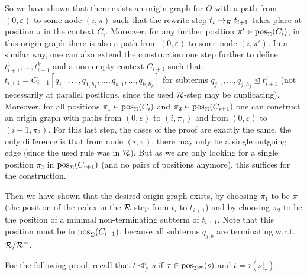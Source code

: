 \begin{myproof}
So we have shown that 
    there exists an origin graph for $\Theta$ with a path from
    $(0,\varepsilon)$ to some node $(i,\pi)$
    such that
    the rewrite step $t_i \to_{\mathcal{R}} t_{i+1}$ takes place at position $\pi$ in the context
    $C_i$. Moreover, for any further position $\pi' \in \mathrm{pos}_\Sigma(C_i)$, in this origin
    graph there is also a path from   $(0,\varepsilon)$ to some node $(i,\pi')$.
In a similar way, one can also extend the construction one step further to define 
$t_{i+1}^1,\ldots,t_{i+1}^k$ and a non-empty context $C_{i+1}$ such that
 $t_{i+1} = C_{i+1}[q_{1,1},\ldots,q_{1,h_1}, \ldots, q_{k,1}, \ldots, q_{k, h_k}]$ for
subterms $q_{j,1},\ldots,q_{j,h_j} \trianglelefteq t_{i+1}^j$ (not necessarily at parallel positions, 
since the used $\mathcal{R}$-step may be duplicating).
%
Moreover,  for all  positions $\pi_1 \in \mathrm{pos}_\Sigma(C_i)$ and  $\pi_2 \in \mathrm{pos}_\Sigma(C_{i+1})$
   one
    can construct an origin graph with paths from $(0,\varepsilon)$ to $(i, \pi_1)$ and
from $(0,\varepsilon)$ to
    $(i+1, \pi_2)$.
For this last step,
 the cases of the proof are exactly the same, the only difference is that from node $(i,\pi)$,
    there may only be a single outgoing edge (since the used rule was in $\mathcal{R}$).
    But as we are only looking for a single position $\pi_2$ in $\mathrm{pos}_\Sigma(C_{i+1})$
    (and no pairs of positions anymore), 
    this suffices for the construction.

Then we have shown that the desired origin graph exists, by choosing $\pi_1$ to be $\pi$
(the position of the redex in the $\mathcal{R}$-step from $t_i$ to $t_{i+1}$)
and by choosing $\pi_2$ to be the position of a minimal non-terminating subterm of
$t_{i+1}$. Note that this position must be in $\mathrm{pos}_\Sigma(C_{i+1})$, because all subterms
$q_{j,b}$ are terminating w.r.t.\ $\mathcal{R}/\mathcal{R}^=$.    
\end{myproof}


For the following proof,
recall that $t \trianglelefteq_{\#}^{\tau} s$ if
$\tau \in \mathrm{pos}_{\mathcal{D}^\#}(s)$ and $t = \flat(s|_\tau)$.

\DerelProcOne*

